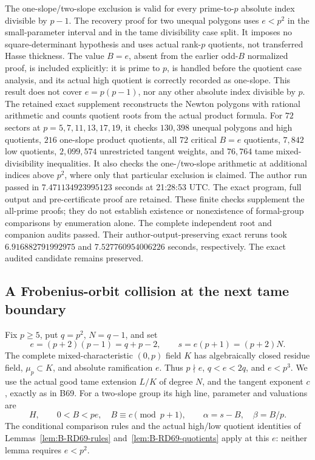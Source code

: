 \begin{remark}
\label{rem:B-RD69-scope}
The one-slope/two-slope exclusion is valid for every
prime-to-\(p\) absolute index divisible by \(p-1\).
The recovery proof for two unequal polygons uses \(e<p^2\)
in the small-parameter interval and in the tame divisibility
case split. It imposes no square-determinant hypothesis and
uses actual rank-\(p\) quotients, not transferred Hasse thickness.
The value \(B=e\), absent from the earlier odd-\(B\) normalized
proof, is included explicitly: it is prime to \(p\), is handled
before the quotient case analysis, and its actual high quotient
is correctly recorded as one-slope.
This result does not cover \(e=p(p-1)\), nor any other absolute
index divisible by \(p\).
The retained exact supplement
reconstructs the Newton polygons with rational arithmetic and
counts quotient roots from the actual product formula.
For \(72\) sectors at \(p=5,7,11,13,17,19\), it checks
\(130{,}398\) unequal polygons and high quotients,
\(216\) one-slope product quotients, all \(72\) critical
\(B=e\) quotients, \(7{,}842\) low quotients,
\(2{,}099{,}574\) unrestricted tangent weights, and
\(76{,}764\) tame mixed-divisibility inequalities.
It also checks the one-/two-slope arithmetic at additional
indices above \(p^2\), where only that particular exclusion is
claimed. The author run passed in \(7.471134923995123\) seconds
at 21:28:53 UTC. The exact program, full output and pre-certificate
proof are retained. These finite checks supplement the all-prime
proofs; they do not establish existence or nonexistence of
formal-group comparisons by enumeration alone.
The complete independent root and companion audits passed.
Their author-output-preserving exact reruns took
\(6.916882791992975\) and \(7.527760954006226\) seconds,
respectively. The exact audited candidate remains preserved.
\end{remark}


\subsection{A Frobenius-orbit collision at the next tame boundary}

Fix \(p\ge5\), put \(q=p^2\), \(N=q-1\), and set
\[
 e=(p+2)(p-1)=q+p-2,\qquad s=e(p+1)=(p+2)N.
 \tag{B-RD70.1}
\]
The complete mixed-characteristic \((0,p)\) field \(K\) has
algebraically closed residue field, \(\mu_p\subset K\), and
absolute ramification \(e\). Thus \(p\nmid e\),
\(q<e<2q\), and \(e<p^3\).
We use the actual good tame extension \(L/K\) of degree \(N\),
and the tangent exponent \(c\), exactly as in B69.
For a two-slope group its high line, parameter and valuations are
\[
 H,\qquad 0<B<pe,\quad B\equiv c\pmod{p+1},\qquad
 \alpha=s-B,\quad\beta=B/p .
 \tag{B-RD70.2}
\]
The conditional comparison rules and the actual high/low quotient
identities of Lemmas~\ref{lem:B-RD69-rules}
and~\ref{lem:B-RD69-quotients} apply at this \(e\): neither
lemma requires \(e<p^2\).

